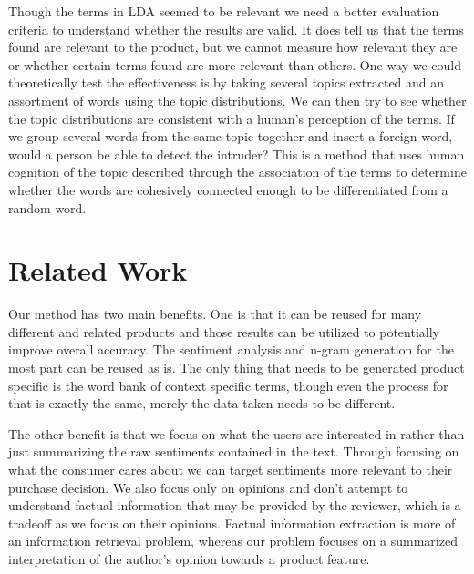 \documentclass{article}
\begin{document}
Though the terms in LDA seemed to be relevant we need a better evaluation criteria to understand whether the results are valid. It does tell us that the terms found are relevant to the product, but we cannot measure how relevant they are or whether certain terms found are more relevant than others. One way we could theoretically test the effectiveness is by taking several topics extracted and an assortment of words using the topic distributions. We can then try to see whether the topic distributions are consistent with a human's perception of the terms. If we group several words from the same topic together and insert a foreign word, would a person be able to detect the intruder? This is a method that uses human cognition of the topic described through the association of the terms to determine whether the words are cohesively connected enough to be differentiated from a random word.

\section{Related Work}
Our method has two main benefits. One is that it can be reused for many different and related products and those results can be utilized to potentially improve overall accuracy. The sentiment analysis and n-gram generation for the most part can be reused as is. The only thing that needs to be generated product specific is the word bank of context specific terms, though even the process for that is exactly the same, merely the data taken needs to be different.

The other benefit is that we focus on what the users are interested in rather than just summarizing the raw sentiments contained in the text. Through focusing on what the consumer cares about we can target sentiments more relevant to their purchase decision. We also focus only on opinions and don’t attempt to understand factual information that may be provided by the reviewer, which is a tradeoff as we focus on their opinions. Factual information extraction is more of an information retrieval problem, whereas our problem focuses on a summarized interpretation of the author’s opinion towards a product feature.
\end{document}
